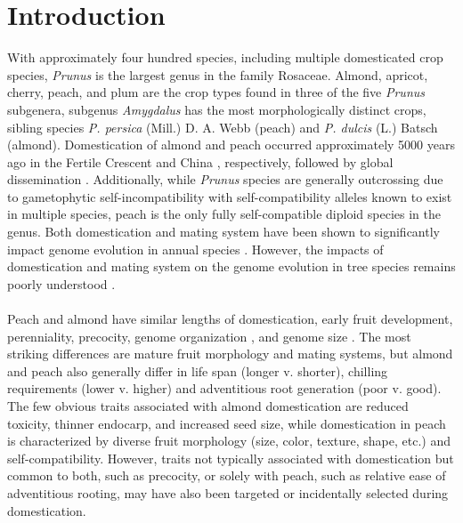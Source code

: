 \documentclass[12pt]{article}
\begin{document}
\section*{Introduction}
%
With approximately four hundred species, including multiple domesticated crop species, \emph{Prunus} is the largest genus in the family Rosaceae.
%
Almond, apricot, cherry, peach, and plum are the crop types found in three of the five \emph{Prunus} subgenera, subgenus \emph{Amygdalus} has the most morphologically distinct crops, sibling species \emph{P. persica} (Mill.) D. A. Webb (peach) and \emph{P. dulcis} (L.) Batsch (almond).
%
Domestication of almond and peach occurred approximately 5000 years ago in the Fertile Crescent and China \citep{zohary2012domestication}, respectively, followed by global dissemination \citep{hedrick1917peaches, edwards1975almond, gradziel2011origin, zheng2014archaeological}.
%
Additionally, while \emph{Prunus} species are generally outcrossing due to gametophytic self-incompatibility with self-compatibility alleles known to exist in multiple species, peach is the only fully self-compatible diploid species in the genus. 
%
Both domestication and mating system have been shown to significantly impact genome evolution in annual species \citep{glemin2006impact, doebley2006molecular, slotte2013capsella}. 
%
However, the impacts of domestication and mating system on the genome evolution in tree species remains poorly understood \citep{mckey2010evolutionary, miller2011forest}.
\\
\\
Peach and almond have similar lengths of domestication, early fruit development, perenniality, precocity, genome organization \citep{arus2012peach}, and genome size \citep{arumuganathan1991nuclear, dickson1992nuclear, baird1994estimating, loureiro2007two}.
%
The most striking differences are mature fruit morphology and mating systems, but almond and peach also generally differ in life span (longer v. shorter), chilling requirements (lower v. higher) and adventitious root generation (poor v. good).
%
The few obvious traits associated with almond domestication are reduced toxicity, thinner endocarp, and increased seed size, while domestication in peach is characterized by diverse fruit morphology (size, color, texture, shape, etc.) and self-compatibility.
%
However, traits not typically associated with domestication but common to both, such as precocity, or solely with peach, such as relative ease of adventitious rooting, may have also been targeted or incidentally selected during domestication. 
\end{document}
